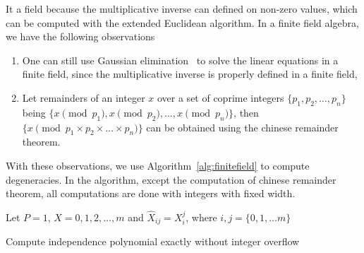 \documentclass{article}
\newcommand{\<}{\langle}
\renewcommand{\>}{\rangle}
\renewcommand{\cite}[1]{{\citep{#1}}}
\theoremstyle{definition}\newtheorem{definition}{\textit{Definition}}
\begin{document}
It a field because the multiplicative inverse can defined on non-zero values, which can be computed with the extended Euclidean algorithm.
In a finite field algebra, we have the following observations
\begin{enumerate}
    \item One can still use Gaussian elimination~\cite{Golub2013} to solve the linear equations in a finite field, since the multiplicative inverse is properly defined in a finite field,
    \item Let remainders of an integer $x$ over a set of coprime integers $\{p_1, p_2, \ldots, p_n\}$ being $\{x \pmod {p_1}, x\pmod {p_2}, \ldots, x \pmod {p_n}\}$,
    then $\{x \pmod {p_1 \times p_2 \times \ldots \times p_n}\}$ can be obtained using the chinese remainder theorem.
\end{enumerate}
With these observations, we use Algorithm~\ref{alg:finitefield} to compute degeneracies.
In the algorithm, except the computation of chinese remainder theorem, all computations are done with integers with fixed width.

\begin{algorithm}[!ht]
    \small
    \SetAlgoNoLine
    \LinesNumbered
    Let $P = 1$, $X = {0,1,2,\ldots,m}$ and $\hat X_{ij} = X_i^j$, where $i,j = \{0, 1, \ldots m\}$\;
    \caption{Compute independence polynomial exactly without integer overflow}\label{alg:finitefield}
\end{algorithm}
\end{document}
